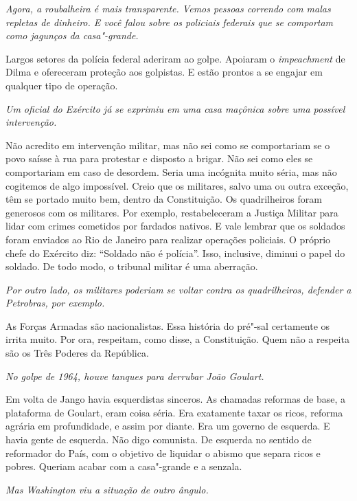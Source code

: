 \itshape
 Agora, a roubalheira é mais transparente. Vemos pessoas
correndo com malas repletas de dinheiro. E você falou sobre os policiais
federais que se comportam como jagunços da casa"-grande.

\normalfont 
Largos setores da polícia federal aderiram ao golpe.
Apoiaram o \emph{impeachment} de Dilma e ofereceram proteção aos
golpistas. E estão prontos a se engajar em qualquer tipo de operação.

\itshape
 Um oficial do Exército já se exprimiu em uma casa
maçônica sobre uma possível intervenção.

\normalfont 
Não acredito em intervenção militar, mas não sei como se
comportariam se o povo saísse à rua para protestar e disposto a brigar.
Não sei como eles se comportariam em caso de desordem. Seria uma
incógnita muito séria, mas não cogitemos de algo impossível. Creio que
os militares, salvo uma ou outra exceção, têm se portado muito bem,
dentro da Constituição. Os quadrilheiros foram generosos com os
militares. Por exemplo, restabeleceram a Justiça Militar para lidar com
crimes cometidos por fardados nativos. E vale lembrar que os soldados
foram enviados ao Rio de Janeiro para realizar operações policiais. O
próprio chefe do Exército diz: ``Soldado não é polícia''. Isso,
inclusive, diminui o papel do soldado. De todo modo, o tribunal militar
é uma aberração.

\itshape
 Por outro lado, os militares poderiam se voltar contra
os quadrilheiros, defender a Petrobras, por exemplo.

\normalfont 
As Forças Armadas são nacionalistas. Essa história do
pré"-sal certamente os irrita muito. Por ora, respeitam, como disse, a
Constituição. Quem não a respeita são os Três Poderes da República.

\itshape
 No golpe de
1964, houve tanques para derrubar João Goulart.

\normalfont 
Em volta de Jango havia esquerdistas sinceros. As
chamadas reformas de base, a plataforma de Goulart, eram coisa séria.
Era exatamente taxar os ricos, reforma agrária em profundidade, e assim
por diante. Era um governo de esquerda. E havia gente de esquerda. Não
digo comunista. De esquerda no sentido de reformador do País, com o
objetivo de liquidar o abismo que separa ricos e pobres. Queriam acabar
com a casa"-grande e a senzala.

\itshape
 Mas Washington viu a situação de outro ângulo.

